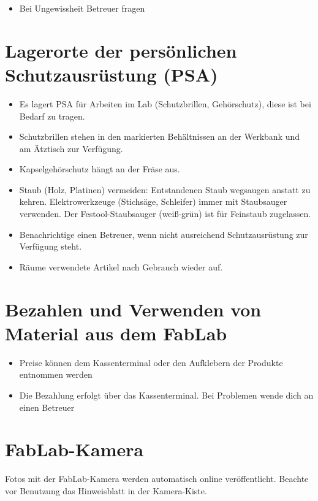\documentclass[13pt]{\basedir/fablab-document}
\begin{document}
\begin{itemize}
	\item Bei Ungewissheit Betreuer fragen
\end{itemize}



\section{Lagerorte der persönlichen Schutzausrüstung (PSA)}
\begin{itemize}
	\item Es lagert PSA für Arbeiten im Lab (Schutzbrillen, Gehörschutz), diese ist bei Bedarf zu tragen.
	\item Schutzbrillen stehen in den markierten Behältnissen an der Werkbank und am Ätztisch zur Verfügung.
	\item Kapselgehörschutz hängt an der Fräse aus.
	\item Staub (Holz, Platinen) vermeiden: Entstandenen Staub wegsaugen anstatt zu kehren. Elektrowerkzeuge (Stichsäge, Schleifer) immer mit Staubsauger verwenden. Der Festool-Staubsauger (weiß-grün) ist für Feinstaub zugelassen.
	\item Benachrichtige einen Betreuer, wenn nicht ausreichend Schutzausrüstung zur Verfügung steht.
	\item Räume verwendete Artikel nach Gebrauch wieder auf.
\end{itemize}



\section{Bezahlen und Verwenden von Material aus dem FabLab}
\begin{itemize}
	\item Preise können dem Kassenterminal oder den Aufklebern der Produkte entnommen werden
	\item Die Bezahlung erfolgt über das Kassenterminal. Bei Problemen wende dich an einen Betreuer
	
\end{itemize}

\section{FabLab-Kamera}
Fotos mit der FabLab-Kamera werden automatisch online veröffentlicht. Beachte vor Benutzung das Hinweisblatt in der Kamera-Kiste.
\end{document}
